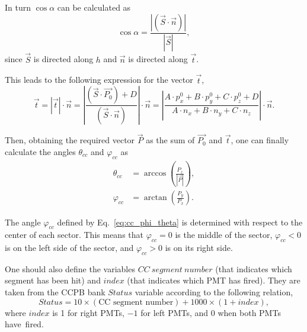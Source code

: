 In turn $\cos \alpha$ can be calculated as
\begin{equation}
\cos \alpha = \frac{|(\overrightarrow{S}\cdot \overrightarrow{n})|}{|\overrightarrow{S}|},
\end{equation}
since $\overrightarrow{S}$ is directed along $h$ and $\overrightarrow{n}$ is directed along $\overrightarrow{t}$. 


This leads to the following expression for the vector $\overrightarrow{t}$,
\begin{equation}
 \overrightarrow{t} =  | \overrightarrow{t}  |\cdot \overrightarrow{n}  =\left | \frac{(\overrightarrow{S} \cdot \overrightarrow{P_{0}})+D}{(\overrightarrow{S} \cdot \overrightarrow{n})}\right |\cdot \overrightarrow{n}   = \left | \frac{A\! \cdot\! p_{x}^{0}+B\! \cdot\! p_{y}^{0}+C\! \cdot\! p_{z}^{0}+D}{A \!\cdot\! n_{x}+B\! \cdot\! n_{y}+C \!\cdot\! n_{z}}\right |\cdot\overrightarrow{n}.
\label{eq:cc_t_vec} 
\end{equation}


Then, obtaining the required vector $\overrightarrow{P}$ as the sum of $\overrightarrow{P_{0}}$ and $\overrightarrow{t}$, one can finally calculate the angles $\theta_{cc}$ and $\varphi_{cc}$ as 
\begin{equation}
\begin{aligned}
\theta_{cc}&=\arccos\left ( \frac{P_z}{| \overrightarrow{P}  |}\right ),\\
\varphi_{cc} & =  \arctan\left ( \frac{P_{y}}{P_{x}} \right ). 
\label{eq:cc_phi_theta} 
\end{aligned}
\end{equation}

The angle $\varphi_{cc}$ defined by Eq.~\eqref{eq:cc_phi_theta} is determined with respect to the center of each sector. This means that $\varphi_{cc} = 0$ is the middle of the sector, $\varphi_{cc} < 0$ is on the left side of the sector, and $\varphi_{cc} > 0$ is on its right side.

One should also define the variables $CC~segment~number$ (that indicates which segment has been hit) and $index$ (that indicates which PMT has fired). They are taken from the CCPB bank $Status$ variable according to the following relation,
\begin{equation}
Status = 10\times(\text{CC segment number}) + 1000\times( 1 + index),
\label{eq:cc_segment}
\end{equation}
where $index$ is 1 for right PMTs, $-1$ for left PMTs, and 0 when both PMTs have~fired.


